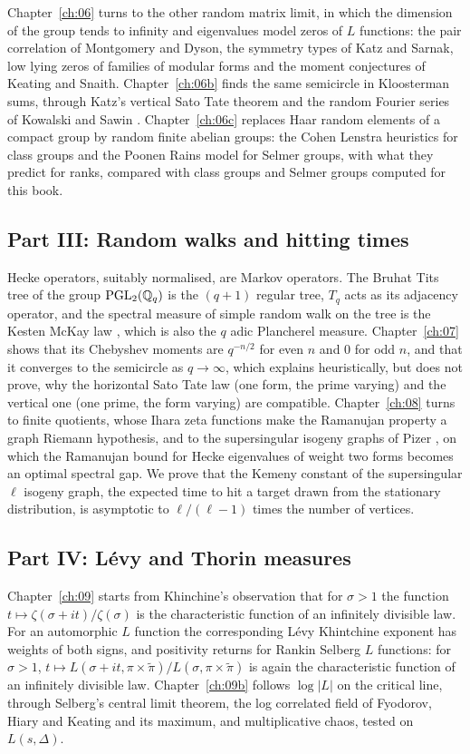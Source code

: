 Chapter~\ref{ch:06} turns to the other random matrix limit, in which the dimension of the group tends to infinity and eigenvalues model zeros of $L$ functions: the pair correlation of Montgomery and Dyson, the symmetry types of Katz and Sarnak, low lying zeros of families of modular forms and the moment conjectures of Keating and Snaith. Chapter~\ref{ch:06b} finds the same semicircle in Kloosterman sums, through Katz's vertical Sato Tate theorem \cite{katz1988} and the random Fourier series of Kowalski and Sawin \cite{kowalskisawin2016}. Chapter~\ref{ch:06c} replaces Haar random elements of a compact group by random finite abelian groups: the Cohen Lenstra heuristics for class groups and the Poonen Rains model for Selmer groups, with what they predict for ranks, compared with class groups and Selmer groups computed for this book.

\subsection{Part III: Random walks and hitting times}
Hecke operators, suitably normalised, are Markov operators. The Bruhat Tits tree of the group $\mathrm{PGL}_2(\mathbb{Q}_q)$ is the $(q+1)$ regular tree, $T_q$ acts as its adjacency operator, and the spectral measure of simple random walk on the tree is the Kesten McKay law \cite{kesten1959,mckay1981}, which is also the $q$ adic Plancherel measure. Chapter~\ref{ch:07} shows that its Chebyshev moments are $q^{-n/2}$ for even $n$ and $0$ for odd $n$, and that it converges to the semicircle as $q\to\infty$, which explains heuristically, but does not prove, why the horizontal Sato Tate law (one form, the prime varying) and the vertical one (one prime, the form varying) are compatible. Chapter~\ref{ch:08} turns to finite quotients, whose Ihara zeta functions make the Ramanujan property a graph Riemann hypothesis, and to the supersingular isogeny graphs of Pizer \cite{pizer1990}, on which the Ramanujan bound for Hecke eigenvalues of weight two forms becomes an optimal spectral gap. We prove that the Kemeny constant of the supersingular $\ell$ isogeny graph, the expected time to hit a target drawn from the stationary distribution, is asymptotic to $\ell/(\ell-1)$ times the number of vertices.

\subsection{Part IV: L\'evy and Thorin measures}
Chapter~\ref{ch:09} starts from Khinchine's observation that for $\sigma>1$ the function $t\mapsto\zeta(\sigma+it)/\zeta(\sigma)$ is the characteristic function of an infinitely divisible law. For an automorphic $L$ function the corresponding L\'evy Khintchine exponent has weights of both signs, and positivity returns for Rankin Selberg $L$ functions: for $\sigma>1$, $t\mapsto L(\sigma+it,\pi\times\tilde\pi)/L(\sigma,\pi\times\tilde\pi)$ is again the characteristic function of an infinitely divisible law. Chapter~\ref{ch:09b} follows $\log|L|$ on the critical line, through Selberg's central limit theorem, the log correlated field of Fyodorov, Hiary and Keating and its maximum, and multiplicative chaos, tested on $L(s,\Delta)$.


